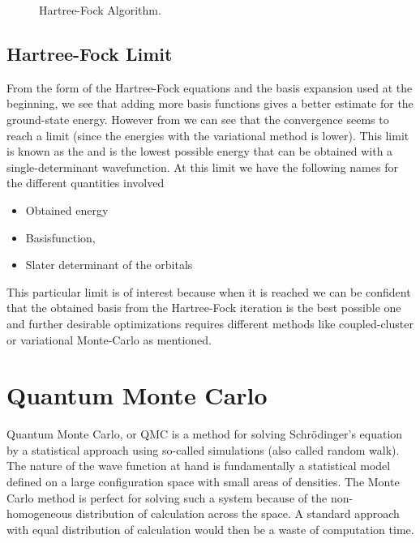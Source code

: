 \begin{figure}[H]
            \caption{Hartree-Fock Algorithm.}
        \end{figure}

\subsection{Hartree-Fock Limit\label{susec:HFL}}
    From the form of the Hartree-Fock equations and the basis expansion used at
    the beginning, we see that adding more basis functions gives a better
    estimate for the ground-state energy. However from  we can
    see that the convergence seems to reach a limit (since the energies with
    the variational method is lower). This limit is known as the
    \cite{HFlimit} and is the lowest possible energy
    that can be obtained with a single-determinant wavefunction. At this limit
    we have the following names for the different quantities involved
        \begin{itemize}
            \item{ Obtained energy}
            \item{ Basisfunction, }
            \item{ Slater determinant of the orbitals}
        \end{itemize}
    This particular limit is of interest because when it is reached we can be
    confident that the obtained basis from the Hartree-Fock iteration is the
    best possible one and further desirable optimizations requires different
    methods like coupled-cluster or variational Monte-Carlo as mentioned.


\section{Quantum Monte Carlo\label{sec:QMC}}
    Quantum Monte Carlo, or QMC is a method for solving Schrödinger's equation
    by a statistical approach using so-called  simulations
    (also called random walk). The nature of the wave function at hand is
    fundamentally a statistical model defined on a large configuration space
    with small areas of densities. The Monte Carlo method is perfect for
    solving such a system because of the non-homogeneous distribution of
    calculation across the space. A standard approach with equal distribution
    of calculation would then be a waste of computation time. 

